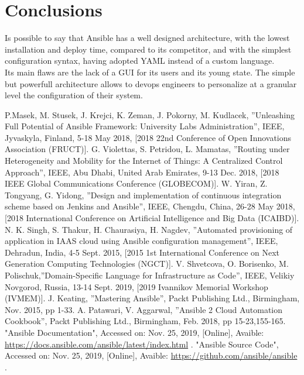 \documentclass[conference]{IEEEtran}
\begin{document}
\section{Conclusions}
Is possible to say that Ansible has a well designed architecture, with the lowest installation and deploy time, compared to its competitor, and with the simplest configuration syntax, having adopted YAML instead of a custom language.\\ Its main flaws are the lack of a GUI for its users and its young state. The simple but powerfull architecture allows to devops engineers to personalize at a granular level the configuration of their system.


\begin{thebibliography}{}
\label{references}
P.Masek, M. Stusek, J. Krejci, K. Zeman, J. Pokorny, M. Kudlacek, ''Unleashing Full Potential of Ansible Framework: University Labs Administration'', IEEE, Jyvaskyla, Finland, 5-18 May 2018, [2018 22nd Conference of Open Innovations Association (FRUCT)].
G. Violettas, S. Petridou, L. Mamatas, ''Routing under Heterogeneity and Mobility for the Internet of Things: A Centralized Control Approach'', IEEE, Abu Dhabi, United Arab Emirates, 9-13 Dec. 2018, [2018 IEEE Global Communications Conference (GLOBECOM)].
W. Yiran, Z. Tongyang, G. Yidong, ''Design and implementation of continuous integration scheme based on Jenkins and Ansible'', IEEE, Chengdu, China, 26-28 May 2018, [2018 International Conference on Artificial Intelligence and Big Data (ICAIBD)].
N. K. Singh, S. Thakur, H. Chaurasiya, H. Nagdev, ''Automated provisioning of application in IAAS cloud using Ansible configuration management'', IEEE, Dehradun, India, 4-5 Sept. 2015, [2015 1st International Conference on Next Generation Computing Technologies (NGCT)].
V. Shvetcova, O. Borisenko, M. Polischuk,''Domain-Specific Language for Infrastructure as Code'', IEEE, Velikiy Novgorod, Russia, 13-14 Sept. 2019, [2019 Ivannikov Memorial Workshop (IVMEM)].
J. Keating, ''Mastering Ansible'', Packt Publishing Ltd., Birmingham, Nov. 2015, pp 1-33.
A. Patawari, V. Aggarwal, ''Ansible 2 Cloud Automation Cookbook'', Packt Publishing Ltd., Birmingham, Feb. 2018, pp 15-23,155-165.
"Ansible Documentation", Accessed on: Nov. 25, 2019, [Online], Avaible: \href{https://docs.ansible.com/ansible/latest/index.html}{https://docs.ansible.com/ansible/latest/index.html} .
"Ansible Source Code", Accessed on: Nov. 25, 2019, [Online], Avaible: \href{https://github.com/ansible/ansible}{https://github.com/ansible/ansible} .
\end{thebibliography}
\end{document}
